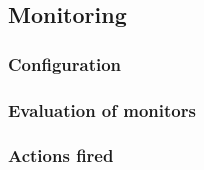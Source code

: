 

\subsection{Monitoring}\label{sec:monitoring}

\subsubsection{Configuration}

\subsubsection{Evaluation of monitors}

\subsubsection{Actions fired}
